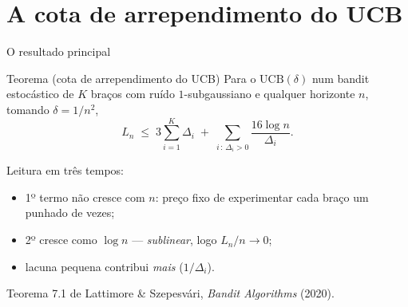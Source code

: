 \documentclass[aspectratio=169, 11pt]{beamer}
\newcommand{\ucb}{\mathrm{UCB}}
\begin{document}
\section{A cota de arrependimento do UCB}

\begin{frame}{O resultado principal}
  \begin{teobox}{Teorema (cota de arrependimento do UCB)}
    Para o $\ucb(\delta)$ num bandit estocástico de $K$ braços com ruído
    $1$-subgaussiano e qualquer horizonte $n$, tomando $\delta = 1/n^{2}$,
    \[
      L_n \;\le\; 3\sum_{i=1}^{K}\Delta_i
        \;+\; \sum_{i\,:\,\Delta_i>0}\frac{16\log n}{\Delta_i}.
    \]
  \end{teobox}

  {\small Leitura em três tempos:
  \begin{itemize}\setlength{\itemsep}{0.2ex}
    \item 1º termo \alert{não cresce com $n$}: preço fixo de experimentar
          cada braço um punhado de vezes;
    \item 2º cresce como $\log n$ --- \emph{sublinear}, logo $L_n/n\to 0$;
    \item lacuna pequena contribui \emph{mais} ($1/\Delta_i$).
  \end{itemize}}

  \vspace{-0.3em}
  {\footnotesize\color{rlCinza} Teorema 7.1 de Lattimore \& Szepesvári,
  \emph{Bandit Algorithms} (2020).}
\end{frame}
\end{document}
